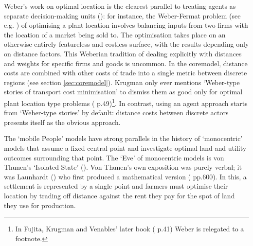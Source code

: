 Weber's work on optimal location is the clearest parallel to treating agents as separate decision-making units (\citealt{ weber_theory_1909}): for instance, the Weber-Fermat problem (see e.g. \citealt{brimberg_fermat-weber_1995}) of optimising a plant location involves balancing inputs from two firms with the location of a market being sold to. The optimisation takes place on an otherwise entirely featureless and costless surface, with the results depending only on distance factors. This Weberian tradition of dealing explicitly with distances and weights for specific firms and goods is uncommon. In the \gls{coremodel}, distance costs are combined with other costs of trade into a single metric between discrete regions (see section \ref{sec:coremodel}). Krugman only ever mentions `Weber-type stories of transport cost minimisation' to dismiss them as good only for optimal plant location type problems (\citealt{krugman_geography_1991} p.49)\footnote{In Fujita, Krugman and Venables' later book (\citeyear{fujita_spatial_2001} p.41) Weber is relegated to a footnote.}. In contrast, using an agent approach starts from `Weber-type stories' by default: distance costs between discrete actors presents itself as the obvious approach. 

The `mobile People' models have strong parallels in the history of `monocentric' models that assume a fixed central point and investigate optimal land and utility outcomes surrounding that point. The `Eve' of monocentric models is von Thunen's `Isolated State' (\citealt{thunen_isolated_1826}). Von Thunen's own exposition was purely verbal; it was Launhardt (\citealt{launhardt_mathematical_1885}) who first produced a mathematical version (\citealt{blaug_economic_1997} pp.600). In this, a settlement is represented by a single point and farmers must optimise their location by trading off distance against the rent they pay for the spot of land they use for production. 

